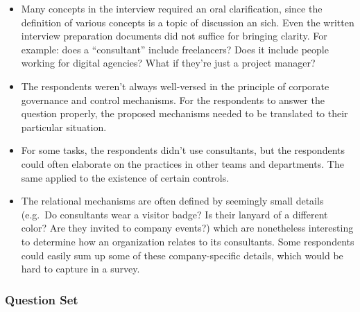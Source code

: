 \documentclass[12pt]{article}
\begin{document}
\begin{itemize}
\item
  Many concepts in the interview required an oral clarification, since
  the definition of various concepts is a topic of discussion an sich.
  Even the written interview preparation documents did not suffice for
  bringing clarity. For example: does a ``consultant'' include
  freelancers? Does it include people working for digital agencies? What
  if they're just a project manager?
\item
  The respondents weren't always well-versed in the principle of
  corporate governance and control mechanisms. For the respondents to
  answer the question properly, the proposed mechanisms needed to be
  translated to their particular situation.
\item
  For some tasks, the respondents didn't use consultants, but the
  respondents could often elaborate on the practices in other teams and
  departments. The same applied to the existence of certain controls.
\item
  The relational mechanisms are often defined by seemingly small details
  (e.g.~Do consultants wear a visitor badge? Is their lanyard of a
  different color? Are they invited to company events?) which are
  nonetheless interesting to determine how an organization relates to
  its consultants. Some respondents could easily sum up some of these
  company-specific details, which would be hard to capture in a survey.
\end{itemize}

\subsubsection{Question Set}\label{question-set}
\end{document}
